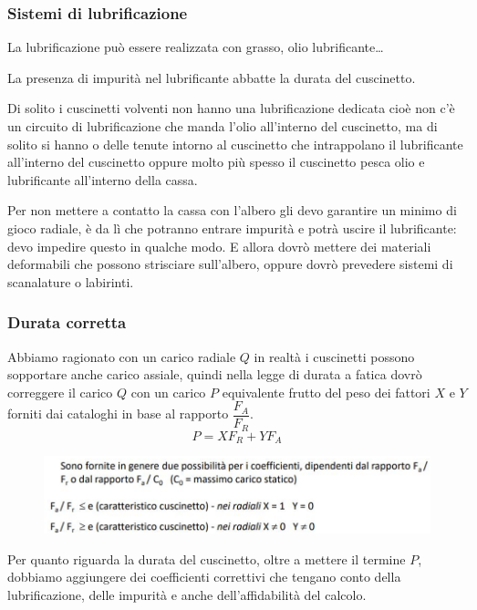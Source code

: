 \documentclass[a4paper, 15pt]{article}
\begin{document}
			\subsubsection{Sistemi di lubrificazione}
			La lubrificazione può essere realizzata con grasso, olio lubrificante\dots
			
			La presenza di impurità nel lubrificante abbatte la durata del cuscinetto. \newline 
			
			Di solito i cuscinetti volventi non hanno una lubrificazione dedicata cioè non c’è un circuito di lubrificazione che manda l’olio all’interno del cuscinetto, ma di solito si hanno o delle tenute intorno al cuscinetto che intrappolano il lubrificante all’interno del cuscinetto oppure molto più spesso il cuscinetto pesca olio e lubrificante all’interno della cassa. \newline 
			
			Per non mettere a contatto la cassa con l’albero gli devo garantire un minimo di gioco radiale, è da lì che potranno entrare impurità e potrà uscire il lubrificante: devo impedire questo in qualche modo.
			E allora dovrò mettere dei materiali deformabili che possono strisciare sull’albero, oppure dovrò prevedere sistemi di scanalature o labirinti. 
			
			\subsubsection{Durata corretta}
			Abbiamo ragionato con un carico radiale $Q$ in realtà i cuscinetti possono sopportare anche carico assiale, quindi nella legge di durata a fatica dovrò correggere il carico $Q$ con un carico $P$ equivalente frutto del peso dei fattori $X$ e $Y$ forniti dai cataloghi in base al rapporto $\dfrac{F_A}{F_R}$.
			\[P = XF_R + YF_A\]
			\begin{figure}[H]
				\centering
				\includegraphics[width=0.5\linewidth]{immagini/screenshot021}
				\label{fig:screenshot021}
			\end{figure}
			Per quanto riguarda la durata del cuscinetto, oltre a mettere il termine $P$, dobbiamo aggiungere dei coefficienti correttivi che tengano conto della lubrificazione, delle impurità e anche dell’affidabilità del calcolo.\newline 
			
\end{document}
